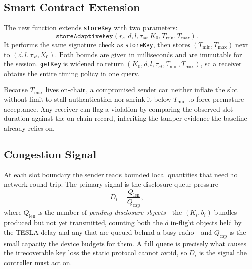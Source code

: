 \documentclass[conference]{IEEEtran}
\begin{document}
\subsection{Smart Contract Extension}\label{sec:contract}
The new function extends \texttt{storeKey} with two parameters:
\begin{equation}
\texttt{storeAdaptiveKey}(r_s, d, l, \tau_{st}, K_0, T_{\min}, T_{\max}).
\end{equation}
It performs the same signature check as \texttt{storeKey}, then stores
$(T_{\min},T_{\max})$ next to $(d,l,\tau_{st},K_0)$. Both bounds are given in
milliseconds and are immutable for the session. \texttt{getKey} is widened to
return $(K_0,d,l,\tau_{st},T_{\min},T_{\max})$, so a receiver obtains the entire
timing policy in one query.

Because $T_{\max}$ lives on-chain, a compromised sender can neither inflate the
slot without limit to stall authentication nor shrink it below $T_{\min}$ to
force premature acceptance. Any receiver can flag a violation by comparing the
observed slot duration against the on-chain record, inheriting the
tamper-evidence the baseline already relies on.

\subsection{Congestion Signal}\label{sec:metrics}
At each slot boundary the sender reads bounded local quantities that need no
network round-trip. The primary signal is the disclosure-queue pressure
\begin{equation}
D_i = \frac{Q_{\mathrm{len}}}{Q_{\mathrm{cap}}},
\label{eq:di}
\end{equation}
where $Q_{\mathrm{len}}$ is the number of \emph{pending disclosure objects}---the
$(K_i,b_i)$ bundles produced but not yet transmitted, counting both the $d$
in-flight objects held by the TESLA delay and any that are queued behind a busy
radio---and $Q_{\mathrm{cap}}$ is the small capacity the device budgets for them.
A full queue is precisely what causes the irrecoverable key loss the static
protocol cannot avoid, so $D_i$ is the signal the controller must act on.
\end{document}
